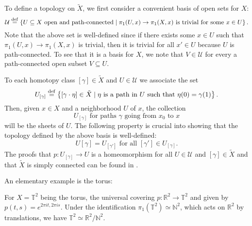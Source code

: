 \documentclass{report}
\begin{document}
To define a topology on $\tilde X$, we first consider a convenient basis of open sets for $X$:
\[
\mathcal U \overset{\mathrm{def}}{=} \left\{ U \subseteq X \text{ open and path-connected} \mid \pi_1(U, x) \to \pi_1(X,x) \text{ is trivial for some } x \in U \right\}.
\]
Note that the above set is well-defined since if there exists some $x\in U$ such that $\pi_1(U,x) \to \pi_1(X,x)$ is trivial, then it is trivial for all $x' \in U$ because $U$ is path-connected.
To see that it is a basis for $X$,  we note that $V \in \mathcal U$ for every a path-connected open subset $V\subseteq U$.

To each homotopy class $[\gamma] \in \tilde X$ and $U \in \mathcal U$ we associate the set
\[
U_{[\gamma]} \overset{\mathrm{def}}{=} \left\{ [\gamma \cdot \eta] \in \tilde X \mid \eta \text{ is a path in } U \text{ such that } \eta(0) = \gamma(1) \right\}.
\]
Then, given $x \in X$ and a neighborhood $U$ of $x$, the collection
\[
U_{[\gamma]} \text{ for paths } \gamma \text{ going from } x_0 \text{ to } x  
\]
will be the sheets of $U$.
The following property is crucial into showing that the topology defined by the above basis is well-defined:
\[
U[\gamma] = U_[\gamma'] \text{ for all } [\gamma'] \in U_{[\gamma]}.
\]
The proofs that $p:U_[\gamma] \to U$ is a homeomorphism for all $U \in \mathcal U$ and $[\gamma] \in \tilde X$ and that $\tilde X$ is simply connected can be found in \cite{hatcher2002topology}.

An elementary example is the torus:
\begin{example}
    For $X = \mathbb T^2$ being the torus, the universal covering $p: \mathbb R^2 \to \mathbb T^2$ and given by $p(t,s) = e^{2\pi i t, 2\pi i s }$.
    Under the identification $\pi_1(\mathbb T^2) \simeq \mathbb N^2$, which acts on $\mathbb R^2$ by translations, we have $\mathbb T^2 \simeq \mathbb R^2 / \mathbb N^2$.
\end{example}
\end{document}

